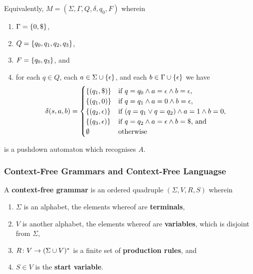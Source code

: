     \noindent Equivalently, \(M = (\Sigma, \Gamma, Q, \delta, q_0, F)\)
    wherein
    \begin{enumerate}
        \item \(\Gamma = \{0, \$\}\),
        \item \(Q = \{q_0, q_1, q_2, q_3\}\),
        \item \(F = \{q_0, q_3\}\), and
        \item for each \(q \in Q\), each \(a \in \Sigma \cup
            \{\epsilon\}\), and each \(b \in \Gamma \cup
            \{\epsilon\}\) we have
            \[
                \delta(s, a, b) = \begin{cases}
                    \{(q_1, \$)\} & \text{if } q = q_0 \land a = \epsilon
                    \land b = \epsilon,\\
                    \{(q_1, 0)\} & \text{if } q = q_1 \land a = 0 \land b =
                    \epsilon,\\
                    \{(q_2, \epsilon)\} & \text{if } (q = q_1 \lor q = q_2)
                    \land a = 1 \land b = 0,\\
                    \{(q_3, \epsilon)\} & \text{if } q = q_2 \land a =
                    \epsilon \land b = \$ \text{, and}\\
                    \emptyset & \text{otherwise}
                \end{cases}
            \]
    \end{enumerate}
    is a pushdown automaton which recognises \(A\).
\Esl

\subsubsection{Context-Free Grammars and Context-Free Languagse}

\Bdf
    A {\bf context-free grammar} is an ordered quadruple \((\Sigma, V, R, S)\)
    wherein
    \begin{enumerate}
        \item \(\Sigma\) is an alphabet, the elements whereof are {\bf
        terminals},
        \item \(V\) is another alphabet, the elements whereof are {\bf
        variables}, which is disjoint from \(\Sigma\),
        \item \(R\colon V\to(\Sigma \cup V)^*\) is a finite set of {\bf
        production rules}, and
        \item \(S \in V\) is the {\bf start variable}.
    \end{enumerate}
\Edf

